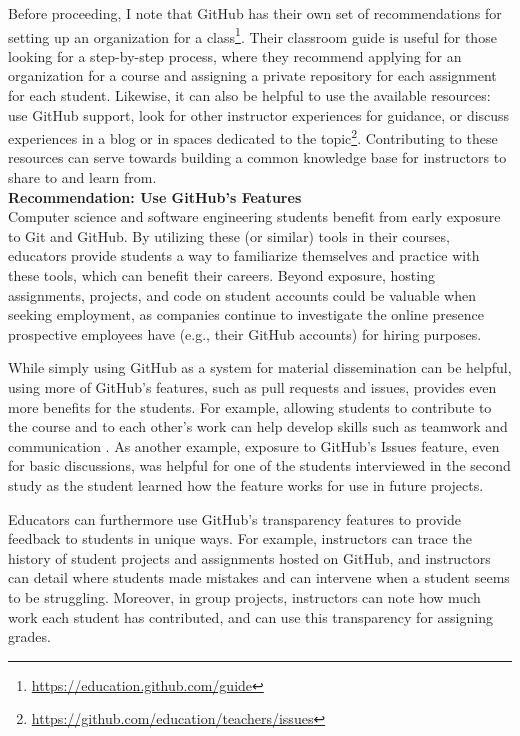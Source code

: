 Before proceeding, I note that GitHub has their own set of recommendations for setting up an organization for a class\footnote{\url{https://education.github.com/guide}}. Their classroom guide is useful for those looking for a step-by-step process, where they recommend applying for an organization for a course and assigning a private repository for each assignment for each student. Likewise, it can also be helpful to use the available resources: use GitHub support, look for other instructor experiences for guidance, or discuss experiences in a blog or in spaces dedicated to the topic\footnote{\url{https://github.com/education/teachers/issues}}. Contributing to these resources can serve towards building a common knowledge base for instructors to share to and learn from. \\

\textbf{Recommendation: Use GitHub's Features} \\
Computer science and software engineering students benefit from early exposure to Git and GitHub. By utilizing these (or similar) tools in their courses, educators provide students a way to familiarize themselves and practice with these tools, which can benefit their careers. Beyond exposure, hosting assignments, projects, and code on student accounts could be valuable when seeking employment, as companies continue to investigate the online presence prospective employees have (e.g., their GitHub accounts) for hiring purposes.

While simply using GitHub as a system for material dissemination can be helpful, using more of GitHub's features, such as pull requests and issues, provides even more benefits for the students. For example, allowing students to contribute to the course and to each other's work can help develop skills such as teamwork and communication \cite{hamer2006some}. As another example, exposure to GitHub's Issues feature, even for basic discussions, was helpful for one of the students interviewed in the second study as the student learned how the feature works for use in future projects.

Educators can furthermore use GitHub's transparency features to provide feedback to students in unique ways. For example, instructors can trace the history of student projects and assignments hosted on GitHub, and instructors can detail where students made mistakes and can intervene when a student seems to be struggling. Moreover, in group projects, instructors can note how much work each student has contributed, and can use this transparency for assigning grades.

